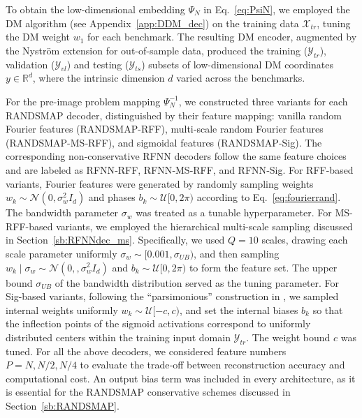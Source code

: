 \documentclass{article}
\begin{document}
To obtain the low-dimensional embedding $\Psi_N$ in Eq.~\eqref{eq:PsiN}, we employed the DM algorithm (see Appendix~\ref{app:DDM_dec}) on the training data $\mathcal{X}_{tr}$, tuning the DM weight $w_1$ for each benchmark. The resulting DM encoder, augmented by the Nystr\"{o}m extension for out-of-sample data, produced the training ($\mathcal{Y}_{tr}$), validation ($\mathcal{Y}_{vl}$) and testing ($\mathcal{Y}_{ts}$) subsets of low-dimensional DM coordinates $y\in\mathbb{R}^d$, where the intrinsic dimension $d$ varied across the benchmarks. %

For the pre-image problem mapping $\Psi_N^{-1}$, we constructed three variants for each RANDSMAP decoder, distinguished by their feature mapping: vanilla random Fourier features (RANDSMAP-RFF), multi‑scale random Fourier features (RANDSMAP-MS‑RFF), and sigmoidal features (RANDSMAP-Sig). The corresponding non‑conservative RFNN decoders follow the same feature choices and are labeled as RFNN‑RFF, RFNN‑MS‑RFF, and RFNN‑Sig. For RFF-based variants, Fourier features were generated by randomly sampling weights $w_k\sim\mathcal{N}(0,\sigma_w^2 I_d)$ and phases $b_k\sim\mathcal{U}[0,2\pi)$ according to Eq.~\eqref{eq:fourierrand}. The bandwidth parameter $\sigma_w$ was treated as a tunable hyperparameter. For MS-RFF-based variants, we employed the hierarchical multi-scale sampling discussed in Section~\ref{sb:RFNNdec_ms}. Specifically, we used $Q=10$ scales, drawing each scale parameter uniformly $\sigma_w\sim[0.001,\sigma_{UB})$, and then sampling $w_k \mid \sigma_w \sim \mathcal{N}(0,,\sigma_w^2 I_d)$ and $b_k\sim\mathcal{U}[0,2\pi)$ to form the feature set. The upper bound $\sigma_{UB}$ of the bandwidth distribution served as the tuning parameter. For Sig-based variants, following the ``parsimonious'' construction in \cite{galaris2022numerical},  
we sampled internal weights uniformly $w_k\sim\mathcal{U}[-c,c)$, and set the internal biases $b_k$ so that the inflection points of the sigmoid activations correspond to uniformly distributed centers within the training input domain $\mathcal{Y}_{tr}$. The weight bound $c$ was tuned. For all the above decoders, we considered feature numbers $P = N, N/2, N/4$ to evaluate the trade‑off between reconstruction accuracy and computational cost. An output bias term was included in every architecture, as it is essential for the RANDSMAP conservative schemes discussed in Section~\ref{sb:RANDSMAP}. 
\end{document}
